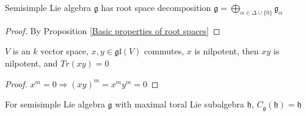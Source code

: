 \documentclass[main]{subfiles}
\begin{document}
\begin{theorem}\label{Root space decomposition}
Semisimple Lie algebra $\mathfrak g$ has root space decomposition $\mathfrak{g}=\displaystyle\bigoplus_{\alpha\in\Delta\cup\{0\}}\mathfrak{g}_\alpha$
\end{theorem}

\begin{proof}
By Proposition \ref{Basic properties of root spaces}
\end{proof}

\begin{lemma}\label{x,y in gl(V) commutes, x nilpotent => xy nilpotent}
$V$ is an $k$ vector space, $x,y\in\mathfrak{gl}(V)$ commutes, $x$ is nilpotent, then $xy$ is nilpotent, and $Tr(xy)=0$
\end{lemma}

\begin{proof}
$x^m=0\Rightarrow(xy)^m=x^my^m=0$
\end{proof}

\begin{proposition}\label{Maximal toral Lie algebra of semisimple Lie algebra is self centralizing}
For semisimple Lie algebra $\mathfrak g$ with maximal toral Lie subalgebra $\mathfrak{h}$, $C_{\mathfrak{g}}(\mathfrak{h})=\mathfrak{h}$
\end{proposition}
\end{document}
